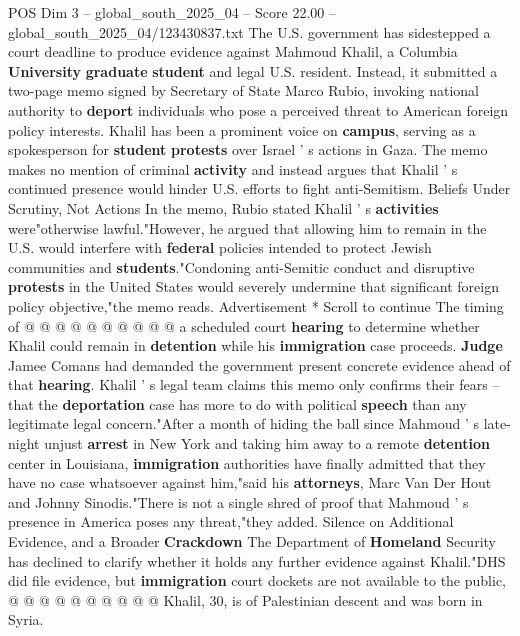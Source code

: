 \begin{textsample}{POS Dim 3 – global\_south\_2025\_04 – Score 22.00 – global\_south\_2025\_04/123430837.txt}  \label{ex:f3_pos_117}
The U.S. government has sidestepped a court deadline to produce evidence against Mahmoud Khalil, a Columbia \textbf{University} \textbf{graduate} \textbf{student} and legal U.S. resident.
Instead, it submitted a two-page memo signed by Secretary of State Marco Rubio, invoking national authority to \textbf{deport} individuals who pose a perceived threat to American foreign policy interests.
Khalil has been a prominent voice on \textbf{campus}, serving as a spokesperson for \textbf{student} \textbf{protests} over Israel ' s actions in Gaza.
The memo makes no mention of criminal \textbf{activity} and instead argues that Khalil ' s continued presence would hinder U.S. efforts to fight anti-Semitism.
Beliefs Under Scrutiny, Not Actions In the memo, Rubio stated Khalil ' s \textbf{activities} were"otherwise lawful."However, he argued that allowing him to remain in the U.S. would interfere with \textbf{federal} policies intended to protect Jewish communities and \textbf{students}."Condoning anti-Semitic conduct and disruptive \textbf{protests} in the United States would severely undermine that significant foreign policy objective,"the memo reads.
Advertisement * Scroll to continue The timing of @ @ @ @ @ @ @ @ @ @ a scheduled court \textbf{hearing} to determine whether Khalil could remain in \textbf{detention} while his \textbf{immigration} case proceeds. \textbf{Judge} Jamee Comans had demanded the government present concrete evidence ahead of that \textbf{hearing}.
Khalil ' s legal team claims this memo only confirms their fears -- that the \textbf{deportation} case has more to do with political \textbf{speech} than any legitimate legal concern."After a month of hiding the ball since Mahmoud ' s late-night unjust \textbf{arrest} in New York and taking him away to a remote \textbf{detention} center in Louisiana, \textbf{immigration} authorities have finally admitted that they have no case whatsoever against him,"said his \textbf{attorneys}, Marc Van Der Hout and Johnny Sinodis."There is not a single shred of proof that Mahmoud ' s presence in America poses any threat,"they added.
Silence on Additional Evidence, and a Broader \textbf{Crackdown} The Department of \textbf{Homeland} Security has declined to clarify whether it holds any further evidence against Khalil."DHS did file evidence, but \textbf{immigration} court dockets are not available to the public, @ @ @ @ @ @ @ @ @ @ Khalil, 30, is of Palestinian descent and was born in Syria.

\end{textsample}
